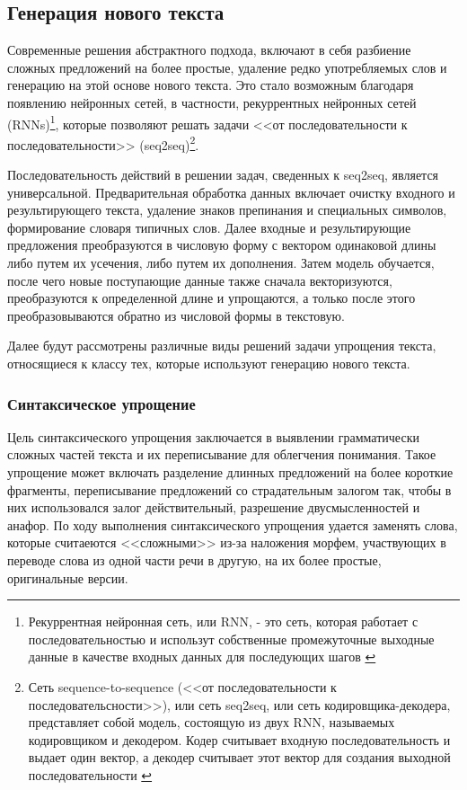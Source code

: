 \subsection{Генерация нового текста}
Современные решения абстрактного подхода,  включают в себя разбиение сложных предложений на более простые, удаление редко употребляемых слов и генерацию на этой основе нового текста. Это стало возможным благодаря появлению нейронных сетей, в частности, рекуррентных нейронных сетей (RNNs)\footnote{Рекуррентная нейронная сеть, или RNN, - это сеть, которая работает с последовательностью и использут собственные промежуточные выходные данные в качестве входных данных для последующих шагов \cite{noauthor_nlp_nodate}}, которые позволяют решать задачи <<от последовательности к последовательности>> (seq2seq)\footnote{Сеть sequence-to-sequence (<<от последовательности к последовательсности>>), или сеть seq2seq, или сеть кодировщика-декодера, представляет собой модель, состоящую из двух RNN, называемых кодировщиком и декодером. Кодер считывает входную последовательность и выдает один вектор, а декодер считывает этот вектор для создания выходной последовательности \cite{noauthor_nlp_nodate}}.

Последовательность действий в решении задач, сведенных к seq2seq, является универсальной. Предварительная обработка данных включает очистку входного и результирующего текста, удаление знаков препинания и специальных символов, формирование словаря типичных слов. Далее входные и результирующие предложения преобразуются в числовую форму с вектором одинаковой длины либо путем их усечения, либо путем их дополнения. Затем модель обучается, после чего новые поступающие данные также сначала векторизуются, преобразуются к определенной длине и упрощаются, а только после этого преобразовываются обратно из числовой формы в текстовую.

Далее будут рассмотрены различные виды решений задачи упрощения текста, относящиеся к классу тех, которые используют генерацию нового текста.

\subsubsection{Синтаксическое упрощение}

Цель синтаксического упрощения заключается в выявлении грамматически сложных частей текста и их переписывание для облегчения понимания. Такое упрощение может включать разделение длинных предложений на более короткие фрагменты, переписывание предложений со страдательным залогом так, чтобы в них использовался залог действительный\footnotemark{}, разрешение двусмысленностей и анафор\cite{shardlow_survey_2014}. По ходу выполнения синтаксического упрощения удается заменять слова, которые считаеются <<сложными>> из-за наложения морфем, участвующих в переводе слова из одной части речи в другую, на их более простые, оригинальные версии.

